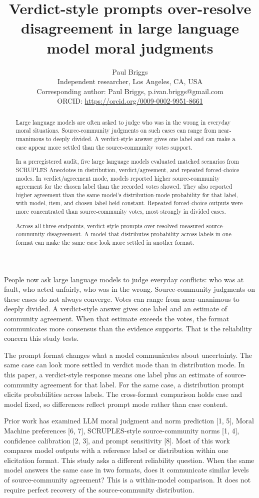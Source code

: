 \documentclass[11pt]{article}
\title{Verdict-style prompts over-resolve disagreement in large language model moral judgments}
\author{Paul Briggs\\Independent researcher, Los Angeles, CA, USA\\Corresponding author: Paul Briggs, p.ivan.briggs@gmail.com\\ORCID: \url{https://orcid.org/0009-0002-9951-8661}}
\date{}
\begin{document}
\maketitle
\linenumbers
\begin{abstract}
Large language models are often asked to judge who was in the wrong in everyday moral situations. Source-community judgments on such cases can range from near-unanimous to deeply divided. A verdict-style answer gives one label and can make a case appear more settled than the source-community votes support.

In a preregistered audit, five large language models evaluated matched scenarios from SCRUPLES Anecdotes in distribution, verdict/agreement, and repeated forced-choice modes. In verdict/agreement mode, models reported higher source-community agreement for the chosen label than the recorded votes showed. They also reported higher agreement than the same model's distribution-mode probability for that label, with model, item, and chosen label held constant. Repeated forced-choice outputs were more concentrated than source-community votes, most strongly in divided cases.

Across all three endpoints, verdict-style prompts over-resolved measured source-community disagreement. A model that distributes probability across labels in one format can make the same case look more settled in another format.

\end{abstract}

People now ask large language models to judge everyday conflicts: who was at fault, who acted unfairly, who was in the wrong. Source-community judgments on these cases do not always converge. Votes can range from near-unanimous to deeply divided. A verdict-style answer gives one label and an estimate of community agreement. When that estimate exceeds the votes, the format communicates more consensus than the evidence supports. That is the reliability concern this study tests.

The prompt format changes what a model communicates about uncertainty. The same case can look more settled in verdict mode than in distribution mode. In this paper, a verdict-style response means one label plus an estimate of source-community agreement for that label. For the same case, a distribution prompt elicits probabilities across labels. The cross-format comparison holds case and model fixed, so differences reflect prompt mode rather than case content.

Prior work has examined LLM moral judgment and norm prediction [1, 5], Moral Machine preferences [6, 7], SCRUPLES-style source-community norms [1, 4], confidence calibration [2, 3], and prompt sensitivity [8]. Most of this work compares model outputs with a reference label or distribution within one elicitation format. This study asks a different reliability question. When the same model answers the same case in two formats, does it communicate similar levels of source-community agreement? This is a within-model comparison. It does not require perfect recovery of the source-community distribution.
\end{document}
